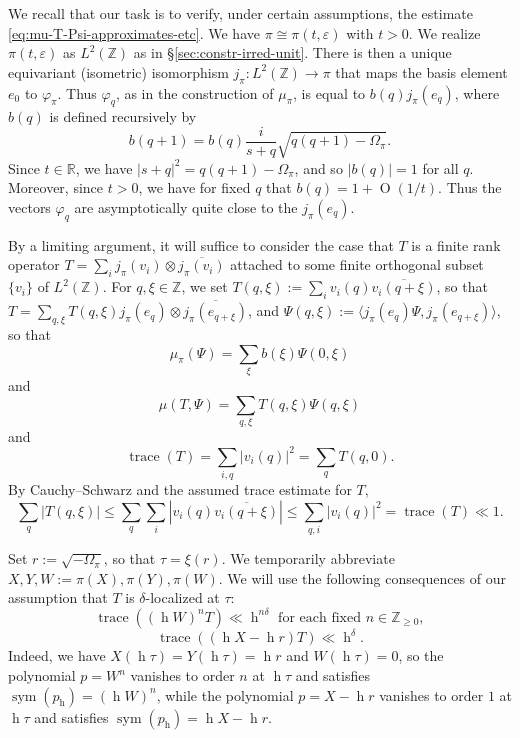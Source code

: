 \documentclass[reqno,10pt]{amsart}
\theoremstyle{plain} %
\theoremstyle{definition}
\theoremstyle{plain} %
\theoremstyle{remark}
\theoremstyle{itplain} %
\theoremstyle{remark} %
\renewcommand{\geq}{\geqslant}
\renewcommand{\leq}{\leqslant}
\numberwithin{equation}{section}
\def\eps{\varepsilon}
\DeclareMathOperator{\trace}{trace}
\def\O{\operatorname{O}}
\DeclareMathOperator{\sym}{sym}
\DeclareMathOperator{\h}{h}
\begin{document}
We recall that our task is to verify, under certain assumptions, the estimate \eqref{eq:mu-T-Psi-approximates-etc}.
We have $\pi \cong \pi(t,\eps)$ with $t > 0$.  We realize $\pi(t,\eps)$ as $L^2(\mathbb{Z})$ as in \S\ref{sec:constr-irred-unit}.  There is then a unique equivariant (isometric) isomorphism $j_\pi : L^2(\mathbb{Z}) \rightarrow \pi$ that maps the basis element $e_0$ to $\varphi_\pi$.  Thus $\varphi_q$, as in the construction of $\mu_\pi$, is equal to $b(q) j_\pi(e_q)$, where $b(q)$ is defined recursively by
\[
  b(q+1) = b(q) \frac{i}{s+q} \sqrt{q(q+1) - \Omega_\pi}.
\]
Since $t \in \mathbb{R}$, we have $|s+q|^2 = q(q+1) - \Omega_\pi$, and so $|b(q)| = 1$ for all $q$.  Moreover, since $t > 0$, we have for fixed $q$ that $b(q) = 1 + \O(1/t)$.  Thus the vectors $\varphi_q$ are asymptotically quite close to the $j_\pi(e_q)$.

By a limiting argument, it will suffice to consider the case that $T$ is a finite rank operator $T = \sum_i j_\pi(v_i) \otimes \overline{j_\pi(v_i)}$ attached to some finite orthogonal subset $\{v_i\}$ of $L^2(\mathbb{Z})$.  For $q,\xi \in \mathbb{Z}$, we set $T(q,\xi) := \sum_i v_i(q) \overline{v_i(q+\xi)}$, so that $T = \sum_{q,\xi} T(q,\xi) j_\pi(e_q) \otimes \overline{j_\pi(e_{q+\xi})}$, and $\Psi(q,\xi) := \langle j_\pi(e_{q}) \Psi, j_\pi(e_{q+\xi}) \rangle$, so that
\[
  \mu_\pi(\Psi) = \sum_{\xi} b(\xi) \Psi(0,\xi)
\]
and
\[
  \mu(T,\Psi) = \sum_{q,\xi} T(q,\xi) \Psi(q,\xi)
\]
and
\[
  \trace(T) = \sum_{i,q} |v_i(q)|^2 = \sum_q T(q,0).
\]
By Cauchy--Schwarz and the assumed trace estimate for $T$,
\begin{equation*}
  \sum_q |T(q,\xi)|
  \leq
  \sum_q \sum_i |v_i(q) \overline{v_i(q + \xi)}|
  \leq \sum_{q,i} |v_i(q)|^2
  = \trace(T)
  \ll 1.
\end{equation*}

Set $r := \sqrt{- \Omega_\pi}$, so that $\tau = \xi(r)$.  We temporarily abbreviate $X,Y,W := \pi(X), \pi(Y), \pi(W)$.  We will use the following consequences of our assumption that $T$ is $\delta$-localized at $\tau$:
\begin{equation}\label{eqn:W-cond-for-T}
  \trace((\h W)^n T) \ll \h^{n \delta}
  \text{ for each fixed $n \in \mathbb{Z}_{\geq 0}$},
\end{equation}
\begin{equation}\label{eqn:X-cond-for-T}
  \trace((\h X - \h r) T) \ll \h^\delta.
\end{equation}
Indeed, we have $X(\h \tau) = Y(\h \tau) = \h r$ and $W(\h \tau) = 0$, so the polynomial $p = W^n$ vanishes to order $n$ at $\h \tau$ and satisfies $\sym(p_{\h}) = (\h W)^n$, while the polynomial $p = X - \h r$ vanishes to order $1$ at $\h \tau$ and satisfies $\sym(p_{\h}) = \h X - \h r$.
\end{document}
